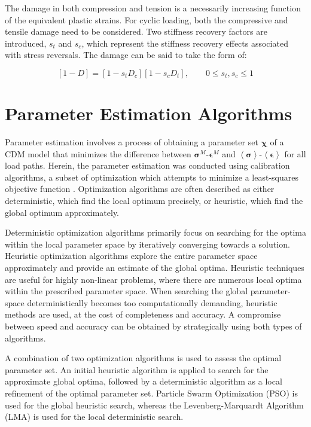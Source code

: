 The damage in both compression and tension is a necessarily increasing
function of the equivalent plastic strains. For cyclic loading, both the compressive and tensile damage need to be considered. Two stiffness recovery factors are introduced, $s_{t}$ and $s_{c}$, which represent the stiffness recovery effects associated with stress reversals. The damage can be said to take the form of:

\begin{equation}
\left[1-D\right]=\left[1-s_{t}D_{c}\right]\left[1-s_{c}D_{t}\right],\qquad0\leq s_{t},s_{c}\leq1\label{eqn:dam4}
\end{equation}

\section{Parameter Estimation Algorithms}

Parameter estimation involves a process of obtaining a parameter set $\boldsymbol{\chi}$ of a CDM model that minimizes the difference between $\boldsymbol{\sigma}^M$-$\boldsymbol{\epsilon}^M$ and $\left<\boldsymbol{\sigma}\right>$-$\left<\boldsymbol{\epsilon}\right>$ for all load paths. Herein, the parameter estimation was conducted using calibration algorithms, a subset of optimization which attempts to minimize a least-squares objective function \citep{matott_ostrich:_2008}. Optimization algorithms are often described as either deterministic, which find the local optimum precisely, or heuristic, which find the global optimum approximately.

Deterministic optimization algorithms primarily focus on searching for the optima within the local parameter space by iteratively converging towards a solution. Heuristic optimization algorithms explore the entire parameter space approximately and provide an estimate of the global optima. Heuristic techniques are useful for highly non-linear problems, where there are numerous local optima within the prescribed parameter space. When searching the global parameter-space deterministically becomes too computationally demanding, heuristic methods are used, at the cost of completeness and accuracy. A compromise between speed and accuracy can be obtained by strategically using both types of algorithms.

A combination of two optimization algorithms is used to assess the optimal parameter set. An initial heuristic algorithm is applied to search for the approximate global optima, followed by a deterministic algorithm as a local refinement of the optimal parameter set. Particle Swarm Optimization (PSO) is used for the global heuristic search, whereas the Levenberg-Marquardt Algorithm (LMA) is used for the local deterministic search. 


